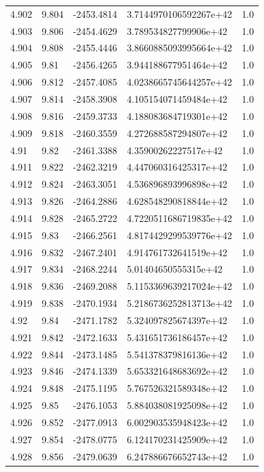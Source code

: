 \begin{tabular}{lllll}
4.902 & 9.804 & -2453.4814 & 3.7144970106592267e+42 & 1.0 \\
4.903 & 9.806 & -2454.4629 & 3.789534827799906e+42 & 1.0 \\
4.904 & 9.808 & -2455.4446 & 3.8660885093995664e+42 & 1.0 \\
4.905 & 9.81 & -2456.4265 & 3.944188677951464e+42 & 1.0 \\
4.906 & 9.812 & -2457.4085 & 4.0238665745644257e+42 & 1.0 \\
4.907 & 9.814 & -2458.3908 & 4.105154071459484e+42 & 1.0 \\
4.908 & 9.816 & -2459.3733 & 4.188083684719301e+42 & 1.0 \\
4.909 & 9.818 & -2460.3559 & 4.272688587294807e+42 & 1.0 \\
4.91 & 9.82 & -2461.3388 & 4.35900262227517e+42 & 1.0 \\
4.911 & 9.822 & -2462.3219 & 4.447060316425317e+42 & 1.0 \\
4.912 & 9.824 & -2463.3051 & 4.536896893996898e+42 & 1.0 \\
4.913 & 9.826 & -2464.2886 & 4.628548290818844e+42 & 1.0 \\
4.914 & 9.828 & -2465.2722 & 4.7220511686719835e+42 & 1.0 \\
4.915 & 9.83 & -2466.2561 & 4.8174429299539776e+42 & 1.0 \\
4.916 & 9.832 & -2467.2401 & 4.914761732641519e+42 & 1.0 \\
4.917 & 9.834 & -2468.2244 & 5.01404650555315e+42 & 1.0 \\
4.918 & 9.836 & -2469.2088 & 5.1153369639217024e+42 & 1.0 \\
4.919 & 9.838 & -2470.1934 & 5.2186736252813713e+42 & 1.0 \\
4.92 & 9.84 & -2471.1782 & 5.324097825674397e+42 & 1.0 \\
4.921 & 9.842 & -2472.1633 & 5.431651736186457e+42 & 1.0 \\
4.922 & 9.844 & -2473.1485 & 5.541378379816136e+42 & 1.0 \\
4.923 & 9.846 & -2474.1339 & 5.653321648683692e+42 & 1.0 \\
4.924 & 9.848 & -2475.1195 & 5.767526321589348e+42 & 1.0 \\
4.925 & 9.85 & -2476.1053 & 5.884038081925098e+42 & 1.0 \\
4.926 & 9.852 & -2477.0913 & 6.002903535948423e+42 & 1.0 \\
4.927 & 9.854 & -2478.0775 & 6.124170231425909e+42 & 1.0 \\
4.928 & 9.856 & -2479.0639 & 6.247886676652743e+42 & 1.0 \\

\end{tabular}
